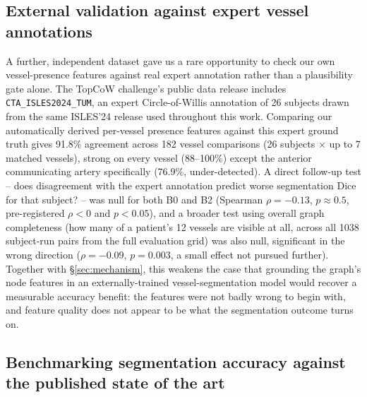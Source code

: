 \subsection{External validation against expert vessel annotations}
\label{sec:topcowvalidation}

A further, independent dataset gave us a rare opportunity to check our own vessel-presence features against real expert annotation rather than a plausibility gate alone. The TopCoW challenge's public data release \cite{topcowbench2026} includes \texttt{CTA\_ISLES2024\_TUM}, an expert Circle-of-Willis annotation of 26 subjects drawn from the same ISLES'24 release used throughout this work. Comparing our automatically derived per-vessel presence features against this expert ground truth gives 91.8\% agreement across 182 vessel comparisons (26 subjects $\times$ up to 7 matched vessels), strong on every vessel (88--100\%) except the anterior communicating artery specifically (76.9\%, under-detected). A direct follow-up test -- does disagreement with the expert annotation predict worse segmentation Dice for that subject? -- was null for both B0 and B2 (Spearman $\rho=-0.13$, $p\approx0.5$, pre-registered $\rho<0$ and $p<0.05$), and a broader test using overall graph completeness (how many of a patient's 12 vessels are visible at all, across all 1038 subject-run pairs from the full evaluation grid) was also null, significant in the wrong direction ($\rho=-0.09$, $p=0.003$, a small effect not pursued further). Together with \S\ref{sec:mechanism}, this weakens the case that grounding the graph's node features in an externally-trained vessel-segmentation model would recover a measurable accuracy benefit: the features were not badly wrong to begin with, and feature quality does not appear to be what the segmentation outcome turns on.


\subsection{Benchmarking segmentation accuracy against the published state of the art}
\label{sec:benchmark}

